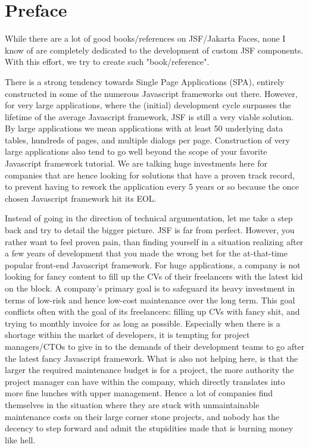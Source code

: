 %

\chapter*{Preface}
While there are a lot of good books/references on JSF/Jakarta Faces, none I know of are completely dedicated to the development of custom JSF components.
With this effort, we try to create such "book/reference".

There is a strong tendency towards Single Page Applications (SPA), entirely constructed in some of the numerous Javascript frameworks out there.
However, for very large applications, where the (initial) development cycle surpasses the lifetime of the average Javascript framework, JSF is still a very viable solution.
By large applications we mean applications with at least 50 underlying data tables, hundreds of pages, and multiple dialogs per page.
Construction of very large applications also tend to go well beyond the scope of your favorite Javascript framework tutorial.
We are talking huge investments here for companies that are hence looking for solutions that have a proven track record, to prevent having to rework the application every 5 years or so because the once chosen Javascript framework hit its EOL.

Instead of going in the direction of technical argumentation, let me take a step back and try to detail the bigger picture.
JSF is far from perfect.
However, you rather want to feel proven pain, than finding yourself in a situation realizing after a few years of development that you made the wrong bet for the at-that-time popular front-end Javascript framework.
For huge applications, a company is not looking for fancy content to fill up the CVs of their freelancers with the latest kid on the block.
A company's primary goal is to safeguard its heavy investment in terms of low-risk and hence low-cost maintenance over the long term.
This goal conflicts often with the goal of its freelancers: filling up CVs with fancy shit, and trying to monthly invoice for as long as possible.
Especially when there is a shortage within the market of developers,
it is tempting for project managers/CTOs to give in to the demands of their development teams to go after the latest fancy Javascript framework.
What is also not helping here, is that the larger the required maintenance budget is for a project,
the more authority the project manager can have within the company,
which directly translates into more fine lunches with upper management.
Hence a lot of companies find themselves in the situation where they are stuck with unmaintainable maintenance costs on their large corner stone projects, and nobody has the decency to step forward and admit the stupidities made that is burning money like hell.

